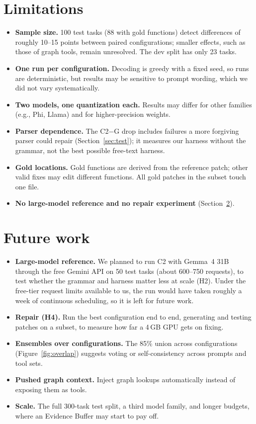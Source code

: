 \documentclass[11pt]{article}
\begin{document}
\section{Limitations}
\label{sec:limitations}
\begin{itemize}
\item \textbf{Sample size.} 100 test tasks (88 with gold functions) detect differences of roughly 10--15 points between paired configurations; smaller effects, such as those of graph tools, remain unresolved. The dev split has only 23 tasks.
\item \textbf{One run per configuration.} Decoding is greedy with a fixed seed, so runs are deterministic, but results may be sensitive to prompt wording, which we did not vary systematically.
\item \textbf{Two models, one quantization each.} Results may differ for other families (e.g., Phi, Llama) and for higher-precision weights.
\item \textbf{Parser dependence.} The C2$-$G drop includes failures a more forgiving parser could repair (Section~\ref{sec:test}); it measures our harness without the grammar, not the best possible free-text harness.
\item \textbf{Gold locations.} Gold functions are derived from the reference patch; other valid fixes may edit different functions. All gold patches in the subset touch one file.
\item \textbf{No large-model reference and no repair experiment} (Section~\ref{sec:future}).
\end{itemize}

\section{Future work}
\label{sec:future}
\begin{itemize}
\item \textbf{Large-model reference.} We planned to run C2 with Gemma~4 31B through the free Gemini API on 50 test tasks (about 600--750 requests), to test whether the grammar and harness matter less at scale (H2). Under the free-tier request limits available to us, the run would have taken roughly a week of continuous scheduling, so it is left for future work.
\item \textbf{Repair (H4).} Run the best configuration end to end, generating and testing patches on a subset, to measure how far a 4\,GB GPU gets on fixing.
\item \textbf{Ensembles over configurations.} The 85\% union across configurations (Figure~\ref{fig:overlap}) suggests voting or self-consistency across prompts and tool sets.
\item \textbf{Pushed graph context.} Inject graph lookups automatically instead of exposing them as tools.
\item \textbf{Scale.} The full 300-task test split, a third model family, and longer budgets, where an Evidence Buffer may start to pay off.
\end{itemize}
\end{document}
